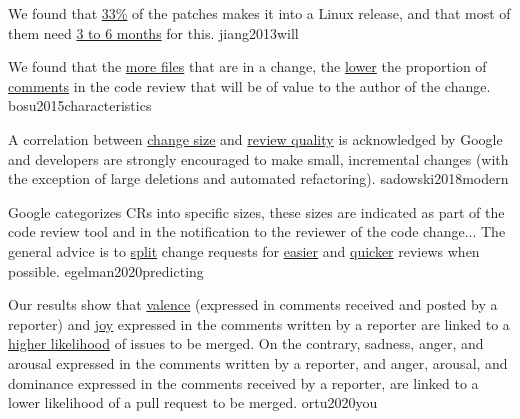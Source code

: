 \documentclass{article}
\begin{document}

  {We found that \ul{33\%} of the patches makes it into a Linux release, and that most of them need \ul{3 to 6 months} for this.}
  {jiang2013will}


  {We found that the \ul{more files} that are in a change, the \ul{lower} the proportion of \ul{comments} in the code review that will be of value to the author of the change.}
  {bosu2015characteristics}

  {A correlation between \ul{change size} and \ul{review quality} is acknowledged by Google and developers are strongly encouraged to make small, incremental changes (with the exception of large deletions and automated refactoring).}
  {sadowski2018modern}


  {Google categorizes CRs into specific sizes, these sizes are indicated as part of the code review tool and in the notification to the reviewer of the code change... The general advice is to \ul{split} change requests for \ul{easier} and \ul{quicker} reviews when possible.}
  {egelman2020predicting}


  {Our results show that \ul{valence} (expressed in comments received and posted by a reporter) and \ul{joy} expressed in the comments written by a reporter are linked to a \ul{higher likelihood} of issues to be merged. On the contrary, sadness, anger, and arousal expressed in the comments written by a reporter, and anger, arousal, and dominance expressed in the comments received by a reporter, are linked to a lower likelihood of a pull request to be merged.}
  {ortu2020you}

\end{document}
